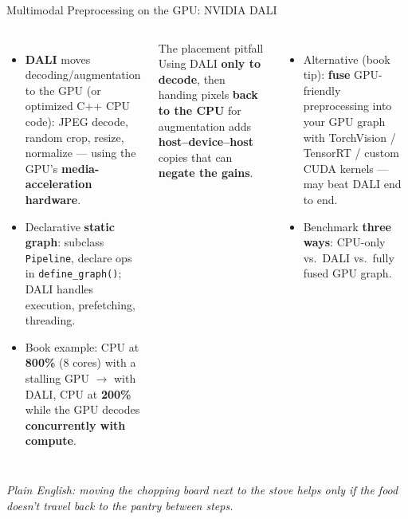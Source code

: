 \documentclass[aspectratio=169]{beamer}
\newcommand{\kw}[1]{\textbf{\textcolor{kwblue}{#1}}}
\newcommand{\pe}[1]{\par{\setlength{\fboxsep}{2.5pt}\noindent\colorbox{navy!9}{\parbox{\dimexpr\textwidth-5pt\relax}{\footnotesize\itshape Plain English: #1}}}}
\begin{document}
\begin{frame}{Multimodal Preprocessing on the GPU: NVIDIA DALI}
  \begin{columns}[t]
    \begin{itemize}\small
      \item \kw{DALI} moves decoding/augmentation to the GPU (or optimized C++ CPU code):
            JPEG decode, random crop, resize, normalize --- using the GPU's
            \kw{media-acceleration hardware}.
      \item Declarative \kw{static graph}: subclass \texttt{Pipeline}, declare ops in
            \texttt{define\_graph()}; DALI handles execution, prefetching, threading.
      \item Book example: CPU at \kw{800\%} (8 cores) with a stalling GPU $\to$ with DALI,
            CPU at \kw{200\%} while the GPU decodes \kw{concurrently with compute}.
    \end{itemize}
    \begin{block}{The placement pitfall}
      \small Using DALI \kw{only to decode}, then handing pixels \kw{back to the CPU} for
      augmentation adds \kw{host--device--host} copies that can \kw{negate the gains}.
    \end{block}
    \begin{itemize}\small
      \item Alternative (book tip): \kw{fuse} GPU-friendly preprocessing into your GPU graph
            with TorchVision / TensorRT / custom CUDA kernels --- may beat DALI end to end.
      \item Benchmark \kw{three ways}: CPU-only vs.\ DALI vs.\ fully fused GPU graph.
    \end{itemize}
  \end{columns}
  \pe{moving the chopping board next to the stove helps only if the food doesn't travel back to the pantry between steps.}
\end{frame}
\end{document}
